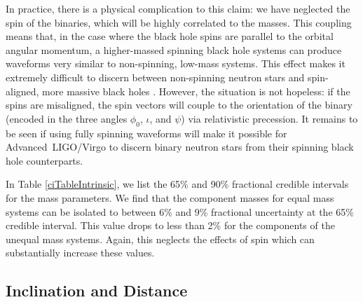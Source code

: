 \documentclass[11pt,a4paper]{emulateapj} 
\begin{document}
In practice, there is a physical complication to this claim: we have
neglected the spin of the binaries, which will be highly correlated to
the masses.  This coupling means that, in the case where the black hole spins
are parallel to the orbital angular momentum, a higher-massed spinning black
hole systems can produce waveforms very similar to non-spinning,
low-mass systems.  This effect makes it extremely difficult to discern between
non-spinning neutron stars and spin-aligned, more massive black holes
\citep{Baird2013,Hannam2013}.  However, the situation is not hopeless:
if the spins are misaligned, the spin vectors will couple to the
orientation of the binary (encoded in the three angles $\phi_0$,
$\iota$, and $\psi$) via relativistic precession.  It remains to be
seen if using fully spinning waveforms will make it possible for
Advanced\ LIGO/Virgo to discern binary neutron stars from their
spinning black hole counterparts.

In Table \ref{ciTableIntrinsic}, we list the 65\% and 90\% fractional credible
intervals for the mass parameters.  We find that the component masses
for equal mass systems can be isolated to between 6\% and 9\%
fractional uncertainty at the 65\% credible interval.  This value
drops to less than 2\% for the components of the unequal mass systems.
Again, this neglects the effects of spin which can substantially
increase these values.


\subsection{Inclination and Distance}
\label{idSection}
\end{document}
